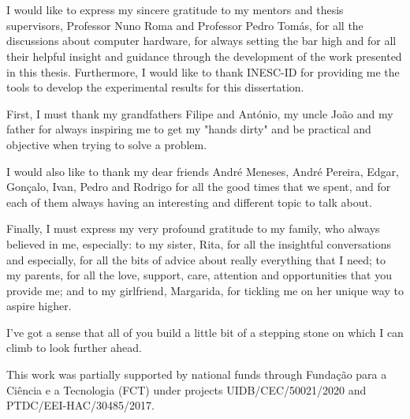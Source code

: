 
\section*{\acknowledgments}


I would like to express my sincere gratitude to my mentors and thesis supervisors, Professor Nuno Roma and Professor Pedro Tomás, for all the discussions about computer hardware, for always setting the bar high and for all their helpful insight and guidance through the development of the work presented in this thesis. Furthermore, I would like to thank INESC-ID for providing me the tools to develop the experimental results for this dissertation.

First, I must thank my grandfathers Filipe and António, my uncle João and my father for always inspiring me to get my "hands dirty" and be practical and objective when trying to solve a problem.

I would also like to thank my dear friends André Meneses, André Pereira, Edgar, Gonçalo, Ivan, Pedro and Rodrigo for all the good times that we spent, and for each of them always having an interesting and different topic to talk about.

Finally, I must express my very profound gratitude to my family, who always believed in me, especially: 
to my sister, Rita, for all the insightful conversations and especially, for all the bits of advice about really everything that I need;
to my parents, for all the love, support, care, attention and opportunities that you provide me;
and to my girlfriend, Margarida, for tickling me on her unique way to aspire higher.

I've got a sense that all of you build a little bit of a stepping stone on which I can climb to look further ahead.

This work was partially supported by national funds through
Fundação para a Ciência e a Tecnologia (FCT) under projects
UIDB/CEC/50021/2020 and PTDC/EEI-HAC/30485/2017.

